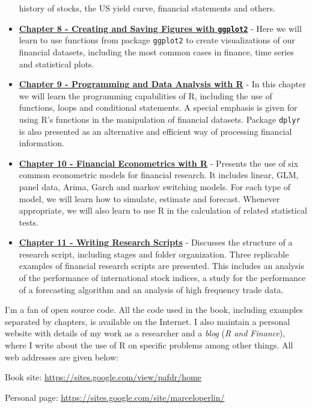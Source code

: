 \documentclass[11pt,]{book}
\begin{document}
\begin{itemize}
  history of stocks, the US yield curve, financial statements and
  others.
\item
  \textbf{\protect\hyperlink{Figures}{Chapter 8 - Creating and Saving
  Figures with \texttt{ggplot2}}} - Here we will learn to use functions
  from package \texttt{ggplot2} to create visualizations of our
  financial datasets, including the most common cases in finance, time
  series and statistical plots.
\item
  \textbf{\protect\hyperlink{programming}{Chapter 9 - Programming and
  Data Analysis with R}} - In this chapter we will learn the programming
  capabilities of R, including the use of functions, loops and
  conditional statements. A special emphasis is given for using R's
  functions in the manipulation of financial datasets. Package
  \texttt{dplyr} is also presented as an alternative and efficient way
  of processing financial information.
\item
  \textbf{\protect\hyperlink{models}{Chapter 10 - Financial Econometrics
  with R}} - Presents the use of six common econometric models for
  financial research. It includes linear, GLM, panel data, Arima, Garch
  and markov switching models. For each type of model, we will learn how
  to simulate, estimate and forecast. Whenever appropriate, we will also
  learn to use R in the calculation of related statistical tests.
\item
  \textbf{\protect\hyperlink{research-scripts}{Chapter 11 - Writing
  Research Scripts}} - Discusses the structure of a research script,
  including stages and folder organization. Three replicable examples of
  financial research scripts are presented. This includes an analysis of
  the performance of international stock indices, a study for the
  performance of a forecasting algorithm and an analysis of high
  frequency trade data.
\end{itemize}

I'm a fan of open source code. All the code used in the book, including
examples separated by chapters, is available on the Internet. I also
maintain a personal website with details of my work as a researcher and
a \emph{blog} (\emph{R and Finance}), where I write about the use of R
on specific problems among other things. All web addresses are given
below:

\vspace{0.5cm}

Book site: \url{https://sites.google.com/view/pafdr/home}

Personal page: \url{https://sites.google.com/site/marceloperlin/}
\end{document}

